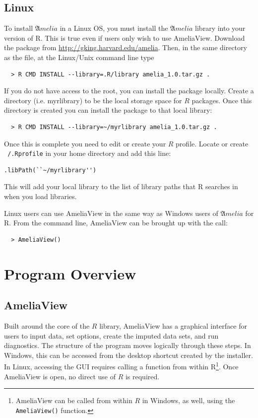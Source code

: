 \documentclass[12pt,titlepage]{article}
\newcommand{\Amelia}{\ensuremath{\mathfrak Amelia} }
\begin{document}
\subsection{Linux}
\label{sec:lin-install}
To install ${\mathfrak Amelia}$ in a Linux OS, you must install the
${\mathfrak Amelia}$ library into your version of R.  This is true
even if users only wish to use AmeliaView.  Download the package from
\url{http://gking.harvard.edu/amelia}.  Then, in the same directory as
the file, at the Linux/Unix command line type
  \begin{verbatim}
  > R CMD INSTALL --library=.R/library amelia_1.0.tar.gz .
  \end{verbatim}
If you do not have access to the root, you can install the package
locally.  Create a directory (i.e. myrlibrary) to be the local storage
space for $R$ packages.  Once this directory is created you can install
the package to that local library:
  \begin{verbatim}
  > R CMD INSTALL --library=~/myrlibrary amelia_1.0.tar.gz .
  \end{verbatim}
Once this is complete you need to edit or create your $R$ profile.
Locate or create \texttt{~/.Rprofile} in your home directory and add
this line:
\begin{verbatim}
.libPath(``~/myrlibrary'')
\end{verbatim}
This will add your local library to the list of library paths that R
searches in when you load libraries.

Linux users can use AmeliaView in the same way as Windows users of
\Amelia for R.  From the command line, AmeliaView can be brought up
with the call:
  \begin{verbatim}
  > AmeliaView()
  \end{verbatim}

\section{Program Overview}
\label{sec:overview}

\subsection{AmeliaView}
\label{sec:guioverview}
Built around the core of the $R$ library, AmeliaView has a graphical
interface for users to input data, set options, create the imputed
data sets, and run diagnostics.  The structure of the program moves
logically through these steps.  In Windows, this can be accessed from
the desktop shortcut created by the installer.  In Linux, accessing
the GUI requires calling a function from within R\footnote{AmeliaView
  can be called from within $R$ in Windows, as well, using the
  \texttt{AmeliaView()} function.}.  Once AmeliaView is open, no direct
use of $R$ is required.
\end{document}
